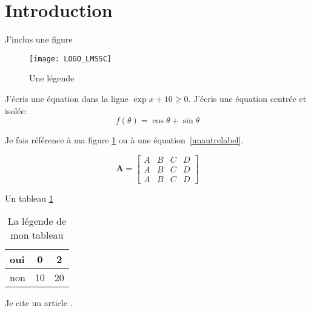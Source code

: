 \section{Introduction}

J'inclus une figure
\begin{figure}[htp!]
\centering
\texttt{[image: LOGO\_LMSSC]}
\caption{Une légende}
\label{unlabel}
\end{figure}
J'écris une équation dans la ligne \(\exp x+10\geq0\).
J'écris une équation centrée et isolée:
\begin{equation}
	f(\theta)=\cos\theta+\sin\theta
	\label{unautrelabel}
\end{equation}

Je fais référence à ma figure \ref{unlabel} ou à une équation~\ref{unautrelabel}.

\begin{equation}
    \mathbf{A}=\begin{bmatrix}
        A&B&C&D\\
        A&B&C&D\\
        A&B&C&D
    \end{bmatrix}
    \label{encoreunlabel}
\end{equation}

Un tableau \ref{labeldemontableau}
\begin{table}[htp]
    \centering
    \begin{tabular}{l|c|c}
        oui&0&2\\\hline
        non&10&20
    \end{tabular}
    \caption{La légende de mon tableau}
    \label{labeldemontableau}
\end{table}

Je cite un article \cite{AAC08a}.